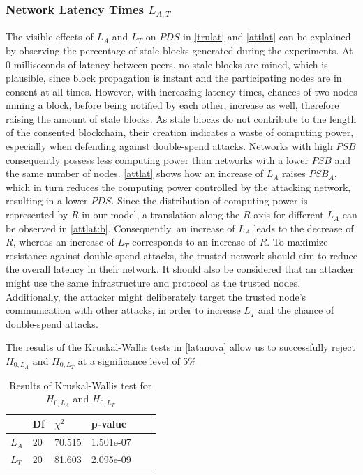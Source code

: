 \documentclass[a4paper,12pt,twoside]{report}
\begin{document}
\subsubsection{Network Latency Times $L_{A,T}$}
The visible effects of $L_{A}$ and $L_{T}$ on $PDS$ in \autoref{trulat} and \autoref{attlat} can be explained by observing the percentage of stale blocks generated during the experiments. At 0 milliseconds of latency between peers, no stale blocks are mined, which is plausible, since block propagation is instant and the participating nodes are in consent at all times. However, with increasing latency times, chances of two nodes mining a block, before being notified by each other, increase as well, therefore raising the amount of stale blocks. As stale blocks do not contribute to the length of the consented blockchain, their creation indicates a waste of computing power, especially when defending against double-spend attacks. Networks with high $PSB$ consequently possess less computing power than networks with a lower $PSB$ and the same number of nodes. \autoref{attlat} shows how an increase of $L_{A}$ raises $PSB_A$, which in turn reduces the computing power controlled by the attacking network, resulting in a lower $PDS$. Since the distribution of computing power is represented by $R$ in our model, a translation along the $R$-axis for different $L_{A}$ can be observed in \autoref{attlat:b}. Consequently, an increase of $L_{A}$ leads to the decrease of $R$, whereas an increase of $L_{T}$ corresponds to an increase of $R$. To maximize resistance against double-spend attacks, the trusted network should aim to reduce the overall latency in their network. It should also be considered that an attacker might use the same infrastructure and protocol as the trusted nodes. Additionally, the attacker might deliberately target the trusted node's communication with other attacks, in order to increase $L_{T}$ and the chance of double-spend attacks.

The results of the Kruskal-Wallis tests in \autoref{latanova} allow us to successfully reject $H_{0,L_A}$ and $H_{0,L_T}$ at a significance level of 5\%
\begin{table}[hb]
\centering
\begin{tabular}{|l|l|l|l|l|l|} \hline
& Df & $\chi^{2}$ & p-value \\ \hline
$L_A$ & 20 &  70.515 & 1.501e-07 \\ \hline
$L_T$ & 20 &  81.603 & 2.095e-09 \\ \hline
\end{tabular}
\caption{Results of Kruskal-Wallis test for $H_{0,L_A}$ and $H_{0,L_T}$}
\label{latanova}
\end{table}
\end{document}
